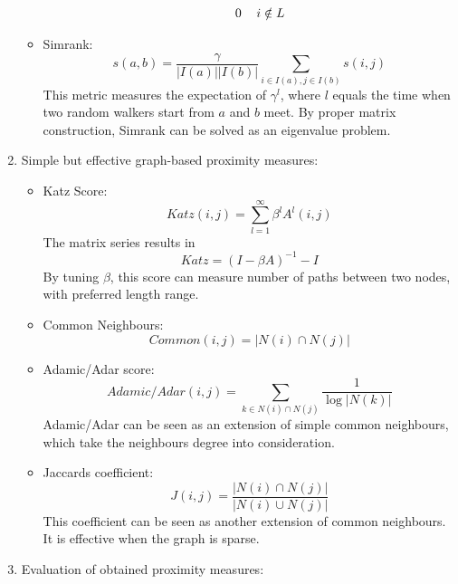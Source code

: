 \documentclass[11pt,a4paper]{article}
\begin{document}
\begin{enumerate}
\begin{itemize}
\begin{itemize}
\begin{equation}
{\begin{tabular}{cc}
							$0$ & $i\notin L $ 
						\end{tabular}}
					\end{equation}
				\end{itemize}
			\item Simrank:
			\begin{equation}
				s(a,b)=\frac{\gamma}{|I(a)||I(b)|}
				\sum_{i \in I(a), j \in I(b)} s(i,j)
			\end{equation}
			This metric measures the expectation of $\gamma^l$, where $l$ equals 
			the time when two random walkers start from $a$ and $b$ meet. By proper 
			matrix construction, Simrank can be solved as an eigenvalue problem. 
		\end{itemize}  
	\item Simple but effective graph-based proximity measures:
		\begin{itemize}
			\item Katz Score:
			\begin{equation}
				Katz(i,j)=\sum_{l=1}^{\infty}{\beta^lA^l(i,j)}
			\end{equation}
			The matrix series results in 
			\begin{equation}
				Katz = (I-\beta A)^{-1} - I
			\end{equation}
			By tuning $\beta$, this score can measure number of paths between 
			two nodes, with preferred length range. 
			\item Common Neighbours:
			\begin{equation}
				Common(i,j) = | N(i) \cap N(j) |
			\end{equation}
			\item Adamic/Adar score:
			\begin{equation}
				Adamic/Adar(i,j) = \sum_{k \in N(i) \cap N(j) }{\frac{1}{\log{|N(k)|}}}
			\end{equation}
			Adamic/Adar can be seen as an extension of simple common neighbours, which 
			take the neighbours degree into consideration. 
			\item Jaccards coefficient:
			\begin{equation}
				J(i,j)=\frac{|N(i) \cap N(j) |}{|N(i) \cup N(j) |}
			\end{equation}
			This coefficient can be seen as another extension of common neighbours. 
			It is effective when the graph is sparse. 
		\end{itemize}
	\item Evaluation of obtained proximity measures:
		\begin{itemize}

\end{itemize}
\end{enumerate}
\end{document}
